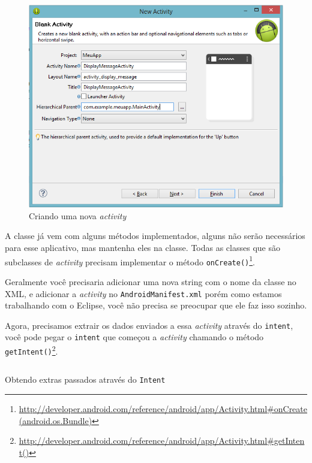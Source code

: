 \documentclass[a4paper,12pt,brazil,doubleside]{book}
\begin{document}
\begin{singlespace}
\begin{figure}[H]
  \centering
  \includegraphics[width=1\textwidth]{figuras/5-criando-app.png}
  \caption{Criando uma nova \emph{activity}}
  \label{fig:e}
\end{figure}

A classe já vem com alguns métodos implementados, alguns não serão necessários para esse aplicativo, mas mantenha eles na classe. Todas as classes que são subclasses de \emph{activity} precisam implementar o método \texttt{onCreate()}\footnote{\href{http://developer.android.com/reference/android/app/Activity.html\#onCreate(android.os.Bundle)}{http://developer.android.com/reference/android/app/Activity.html\#onCreate(android.os.Bundle)}}.

Geralmente você precisaria adicionar uma nova string com o nome da classe no XML, e adicionar a \emph{activity} no \texttt{\textcolor{mygreen}{AndroidManifest.xml}} porém como estamos trabalhando com o Eclipse, você não precisa se preocupar que ele faz isso sozinho.

Agora, precisamos extrair os dados enviados a essa \emph{activity} através do \texttt{intent}, você pode pegar o \texttt{intent} que começou a \emph{activity} chamando o método \texttt{getIntent()}\footnote{\href{http://developer.android.com/reference/android/app/Activity.html\#getIntent()}{http://developer.android.com/reference/android/app/Activity.html\#getIntent()}}.

\begin{listing}[H]
\inputminted[linenos=true,fontsize=\small,frame=lines, framesep=2mm, tabsize=2,numbersep=5pt]{java}{src/firstapp/8.java}
\caption{Obtendo extras passados através do \texttt{Intent}}
\end{listing}


\end{singlespace}
\end{document}
